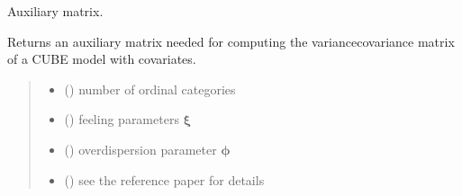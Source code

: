 \documentclass[letterpaper,10pt,english]{sphinxmanual}
\begin{document}

\begin{fulllineitems}
\label{\detokenize{cubmods:cubmods.cube_ywz.auxmat}}
\pysigstartsignatures
{}
\pysigstopsignatures
\sphinxAtStartPar
Auxiliary matrix.

\sphinxAtStartPar
Returns an auxiliary matrix needed for computing the variance\sphinxhyphen{}covariance matrix of a CUBE model with covariates.
\begin{quote}\begin{description}
\begin{itemize}
\item {} 
\sphinxAtStartPar
{} () \textendash{} number of ordinal categories

\item {} 
\sphinxAtStartPar
{} () \textendash{} feeling parameters \(\pmb\xi\)

\item {} 
\sphinxAtStartPar
{} () \textendash{} overdispersion parameter \(\pmb\phi\)

\item {} 
\sphinxAtStartPar
{}\sphinxstyleliteralstrong{\sphinxupquote{,}}\sphinxstyleliteralstrong{\sphinxupquote{,}}\sphinxstyleliteralstrong{\sphinxupquote{,}}\sphinxstyleliteralstrong{\sphinxupquote{,}} () \textendash{} see the reference paper  for details

\end{itemize}

\end{description}\end{quote}

\end{fulllineitems}
\end{document}
